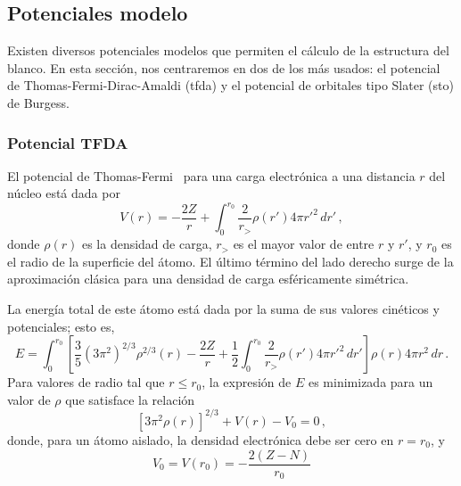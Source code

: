 \subsection{Potenciales modelo}

Existen diversos potenciales modelos que permiten el cálculo de la
estructura del blanco. En esta sección, nos centraremos en dos de los más 
usados: el potencial de Thomas-Fermi-Dirac-Amaldi (\acs{tfda}) y el 
potencial de orbitales tipo Slater (\acs{sto}) de Burgess.

\subsubsection*{Potencial TFDA}

El potencial de Thomas-Fermi~\cite{Gombas:56,Eissner:69,Bautista:08} para 
una carga electrónica a una distancia $r$ del núcleo está dada por
\begin{equation}
V(r)=-\frac{2Z}{r}+\int_0^{r_0}\frac{2}{r_>} \rho(r')4\pi r'^2\,dr'\,,
\label{eq:Thomas-Fermi}
\end{equation}
donde $\rho(r)$ es la densidad de carga, $r_>$ es el mayor valor de entre
$r$ y $r'$, y $r_0$ es el radio de la superficie del átomo. El último
término del lado derecho surge de la aproximación clásica para una 
densidad de carga esféricamente simétrica. 

La energía total de este átomo está dada por la suma de sus valores 
cinéticos y potenciales; esto es,
\begin{equation}
E=\int_0^{r_0}\left[\frac{3}{5}(3\pi^2)^{2/3}\rho^{2/3}(r)-\frac{2Z}{r}
+\frac{1}{2}\int_0^{r_0}\frac{2}{r_>}\rho(r')4\pi r'^2\,dr'\right] 
\rho(r)4\pi r^2\,dr\,.
\label{eq:tot-ener-TF}
\end{equation}
Para valores de radio tal que $r\leq r_0$, la expresión de $E$ es 
minimizada para un valor de $\rho$ que satisface la relación
\begin{equation}
\left[3\pi^2\rho(r)\right]^{2/3}+V(r)-V_0=0\,, 
\end{equation}
donde, para un átomo aislado, la densidad electrónica debe ser cero en
$r=r_0$, y 
\begin{equation}
V_0=V(r_0)=-\frac{2(Z-N)}{r_0}
\end{equation}

